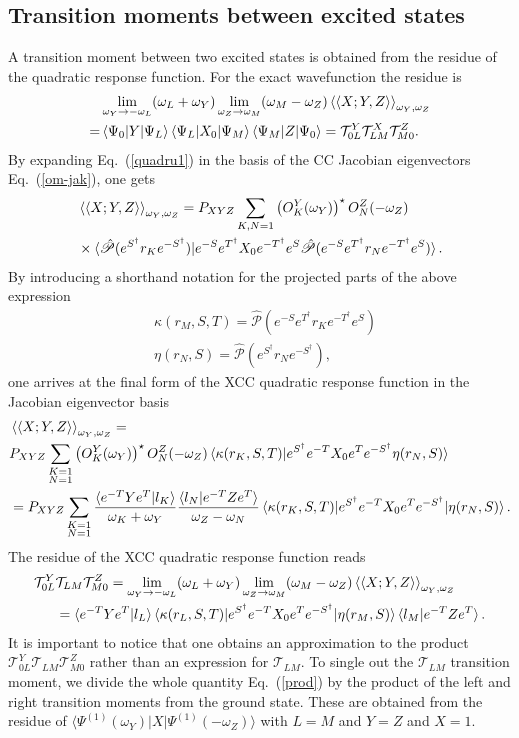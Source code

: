 \documentclass[preprint,12pt]{elsarticle}
\newcommand{\TT}{\mathcal{T}}
\newcommand{\bb}[2]{\braket{ #1|#2}}
\newcommand{\equa}[1]{\begin{align} #1 \end{align}}
\newcommand{\equal}[2]{\begin{align}\label{#2} #1 \end{align}}
\newcommand{\equs}[1]{\begin{equation}\begin{split} #1 \end{split}\end{equation}}
\newcommand{\fr}[1]{Eq.~(\ref{#1})}
\newcommand{\quadraom}{\braket{\braket{X;Y,Z}}_{\omega_Y, \omega_Z}}
\newcommand{\etd}{e^{T^\dagger}}
\newcommand{\esd}{e^{S^\dagger}}
\newcommand{\esdm}{e^{-S^\dagger}}
\newcommand{\etdm}{e^{-T^\dagger}}
\newcommand{\esm}{e^{-S}}
\newcommand{\etm}{e^{-T}}
\newcommand{\es}{e^{S}}
\newcommand{\et}{e^{T}}
\newcommand{\karm}{\kappa(r_M, S, T)}
\newcommand{\kark}{\kappa(r_K, S, T)}
\newcommand{\karl}{\kappa(r_L, S, T)}
\newcommand{\etrn}{\eta(r_N, S)}
\newcommand{\etrm}{\eta(r_M, S)}
\newcommand{\xmz}{X_0}
\newcommand{\odpq}{\braket{\braket{X;Y,Z}}_{\omega_Y,\omega_Z}}
\newcommand{\phm}{\hat{\mathscr{P}}}
\begin{document}
\subsection{Transition moments between  excited states}
A transition moment between two excited states is obtained from the residue of the quadratic response function. For
the exact wavefunction the residue is
\equal{&\lim_{\omega_Y\rightarrow -\omega_L}(\omega_L + \omega_Y)\lim_{\omega_Z\rightarrow \omega_M}(\omega_M - \omega_Z) \odpq\\
 = &\braket{\Psi_0|Y|\Psi_L}\braket{\Psi_L|X_0|\Psi_M}\braket{\Psi_M|Z|\Psi_0} =\TT^Y_{0L}\TT^X_{LM}\TT^Z_{M0}\nonumber.
}{tmexact}
By expanding \fr{quadru1} in the basis of the CC Jacobian eigenvectors \fr{om-jak}, one gets
\equa{&\quadraom = 
  P_{XYZ}\sum_{K, N =1}\left(O_K^Y(\omega_Y)\right)^{\star}O_N^Z(-\omega_Z)\\
&\times\bb{\phm(\esd r_K\esdm) }{ \esm\etd X_0 \etdm\es \phm(\esm\etd r_N \etdm\es)}.\nonumber
}
\normalsize
By introducing a shorthand notation for the projected parts of the above expression
\equs{
&\karm = \phm\left(\esm\etd r_K\etdm\es\right)\\
&\etrn = \phm\left(\esd r_N\esdm\right),
}
one arrives at the final form of the XCC quadratic response function in the Jacobian eigenvector basis
\equa{&\quadraom = \\
  &P_{XYZ}\sum_{\substack{K=1\\N=1}}\left(O_K^Y(\omega_Y)\right)^{\star}O_N^Z(-\omega_Z)
  \braket{\kark|\esd\etm \xmz\et\esdm \etrn }\nonumber\\
&= P_{XYZ}\sum_{\substack{K=1\\N=1}}\frac{\braket{\etm Y\et|l_K}}{\omega_K + \omega_Y}\frac{\braket{l_N|\etm Z\et}}{\omega_Z - \omega_N}
  \braket{\kark|\esd\etm \xmz\et\esdm | \etrn }.\nonumber}
The  residue of the  XCC quadratic response function reads
\equal{\TT_{0L}^Y &\TT_{LM} \TT^Z_{M0} = \lim_{\omega_Y\rightarrow -\omega_L}(\omega_L + \omega_Y)\lim_{\omega_Z\rightarrow \omega_M}(\omega_M - \omega_Z)\quadraom\\
&= \braket{\etm Y\et|l_L}\braket{\karl|\esd\etm \xmz\et\esdm  | \etrm}\braket{l_M|\etm Z\et}\nonumber.
}{prod}
It is important to notice that one obtains an approximation to the product $\TT_{0L}^Y \TT_{LM} \TT^Z_{M0}$ rather than an expression for $\TT_{LM}$.
To single out the $\TT_{LM}$ transition moment, we 
 divide the whole quantity \fr{prod} by the product of the left and right transition
moments from the ground state.
These are obtained from the  residue of
$\langle \Psi^{(1)}(\omega_Y)|X|\Psi^{(1)}(-\omega_Z) \rangle$ with $L=M$ and $Y=Z$ and $X=1$.
\end{document}
